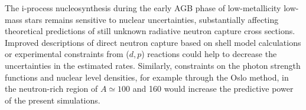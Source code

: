 \documentclass{aa}
\begin{document}
{
The i-process nucleosynthesis during the early AGB phase of low-metallicity low-mass stars remains sensitive to nuclear uncertainties, substantially affecting theoretical predictions of still unknown radiative neutron capture cross sections.  Improved descriptions of direct neutron capture based on shell model calculations or experimental constraints from ($d,p$) reactions could help to decrease the uncertainties in the estimated rates. Similarly, constraints on the photon strength functions and nuclear level densities, for example through the Oslo method, in the neutron-rich region of $A\simeq 100$ and 160 would increase the predictive power of the present simulations.
}






\maketitle


\end{document}
